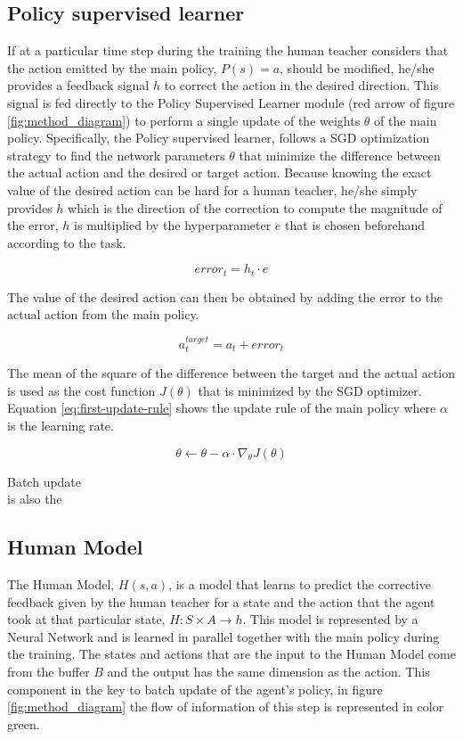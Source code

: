 \subsection*{Policy supervised learner}
If at a particular time step during the training the human teacher considers that the action emitted by the main policy, $P(s) = a$, should be modified, he/she provides a feedback signal $h$ to correct the action in the desired direction. This signal is fed directly to the Policy Supervised Learner module (red arrow of figure \ref{fig:method_diagram}) to perform a single update of the weights $\theta$ of the main policy. Specifically, the Policy supervised learner, follows a SGD optimization strategy to find the network parameters $\theta$ that minimize the difference between the actual action and the desired or target action. Because knowing the exact value of the desired action can be hard for a human teacher, he/she simply provides $h$ which is the direction of the correction to compute the magnitude of the error, $h$ is multiplied by the hyperparameter $e$ that is chosen beforehand according to the task.


\begin{equation}
{error}_t = h_t \cdot  e
\label{eq:error-D-COACH}
\end{equation}

The value of the desired action can then be obtained by adding the error to the actual action from the main policy.

\begin{equation}
a^{target}_t = a_t + {error}_t
\label{eq:a-target}
\end{equation}


The mean of the square of the difference between the target and the actual action is used as the cost function $J(\theta)$ that is minimized by the SGD optimizer. Equation \ref{eq:first-update-rule} shows the update rule of the main policy where $\alpha$ is the learning rate.


\begin{equation}
\theta \leftarrow \theta - \alpha \cdot \nabla_\theta J(\theta)
\label{eq:first-update-rule}
\end{equation}

Batch  update\\ is also the 




\subsection*{Human Model}
The Human Model,  $H(s, a)$, is a model that learns to predict the corrective feedback given by the human teacher for a state and the action that the agent took at that particular state, $H : S \times A \rightarrow{} h$. This model is represented by a Neural Network and is learned in parallel together with the main policy during the training. The states and actions that are the input to the Human Model come from the buffer $B$ and the output has the same dimension as the action.
This component in the key to batch update of the agent's policy, in figure \ref{fig:method_diagram} the flow of information of this step is represented in color green.


